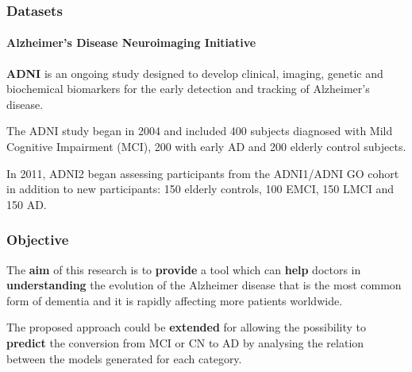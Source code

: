 \begin{frame}
	\frametitle{Datasets}
	\framesubtitle{Alzheimer's Disease Neuroimaging Initiative}
	
	\Large
	
	\vspace{0.4cm}
	
	\textbf{ADNI} is an ongoing study designed to develop clinical, imaging, genetic and biochemical
	biomarkers for the early detection and tracking of Alzheimer's disease.
	
	\vspace{0.3cm}
	
	The ADNI study began in 2004 and included 400 subjects diagnosed with Mild Cognitive Impairment
	(MCI), 200 with early AD and 200 elderly control subjects.\\
	
	\vspace{0.3cm}
	
	In 2011, ADNI2 began assessing participants from the ADNI1/ADNI GO cohort in addition to new
	participants: 150 elderly controls, 100 EMCI, 150 LMCI and 150 AD. \\
\end{frame}

\begin{frame}
	\frametitle{Objective}
	
	\Large
	
	\vspace{0.3cm}
	
	The \textbf{aim} of this research is to \textbf{provide} a tool which can \textbf{help} doctors in
	\textbf{understanding} the evolution of the Alzheimer disease that is the most common form of
	dementia and it is rapidly affecting more patients worldwide.
	
	\vspace{0.4cm}
	
	The proposed approach could be \textbf{extended} for allowing the possibility to \textbf{predict}
	the conversion from MCI or CN to AD by analysing the relation between the models generated for each
	category. \\
\end{frame}
